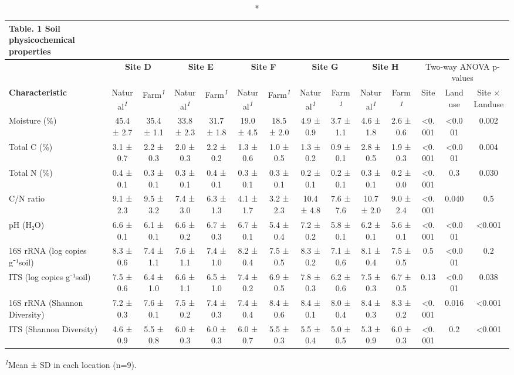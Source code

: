 \newlength\holdLTleft\newlength\holdLTright\setlength\holdLTleft{\LTleft}\relax\setlength\holdLTright{\LTright}\relax\setlength{}
\setlength{}\setlength{\LTpost}{0mm}
\begin{longtable}{@{\extracolsep{\fill}}lccccccccccccc}
\caption*{
{\large Table. 1 Soil physicochemical properties}
} \\ 
\toprule
 & \multicolumn{2}{c}{\textbf{Site D}} & \multicolumn{2}{c}{\textbf{Site E}} & \multicolumn{2}{c}{\textbf{Site F}} & \multicolumn{2}{c}{\textbf{Site G}} & \multicolumn{2}{c}{\textbf{Site H}} & \multicolumn{3}{c}{Two-way ANOVA p-values} \\ 
\cmidrule(lr){2-3} \cmidrule(lr){4-5} \cmidrule(lr){6-7} \cmidrule(lr){8-9} \cmidrule(lr){10-11} \cmidrule(lr){12-14}
\textbf{Characteristic} & Natural\textsuperscript{\textit{1}} & Farm\textsuperscript{\textit{1}} & Natural\textsuperscript{\textit{1}} & Farm\textsuperscript{\textit{1}} & Natural\textsuperscript{\textit{1}} & Farm\textsuperscript{\textit{1}} & Natural\textsuperscript{\textit{1}} & Farm\textsuperscript{\textit{1}} & Natural\textsuperscript{\textit{1}} & Farm\textsuperscript{\textit{1}} & Site & Landuse & Site × Landuse \\ 
\midrule\addlinespace[2.5pt]
Moisture (\%) & 45.4 ± 2.7 & 35.4 ± 1.1 & 33.8 ± 2.3 & 31.7 ± 1.8 & 19.0 ± 4.5 & 18.5 ± 2.0 & 4.9 ± 0.9 & 3.7 ± 1.1 & 4.6 ± 1.8 & 2.6 ± 0.6 & <0.001 & <0.001 & 0.002 \\ 
Total C (\%) & 3.1 ± 0.7 & 2.2 ± 0.3 & 2.0 ± 0.3 & 2.2 ± 0.2 & 1.3 ± 0.6 & 1.0 ± 0.5 & 1.3 ± 0.2 & 0.9 ± 0.1 & 2.8 ± 0.5 & 1.9 ± 0.3 & <0.001 & <0.001 & 0.004 \\ 
Total N (\%) & 0.4 ± 0.1 & 0.3 ± 0.1 & 0.3 ± 0.1 & 0.4 ± 0.1 & 0.3 ± 0.1 & 0.3 ± 0.1 & 0.2 ± 0.1 & 0.2 ± 0.1 & 0.3 ± 0.1 & 0.2 ± 0.0 & <0.001 & 0.3 & 0.030 \\ 
C/N ratio & 9.1 ± 2.3 & 9.5 ± 3.2 & 7.4 ± 3.0 & 6.3 ± 1.3 & 4.1 ± 1.7 & 3.2 ± 2.3 & 10.4 ± 4.8 & 7.6 ± 7.6 & 10.7 ± 2.0 & 9.0 ± 2.4 & <0.001 & 0.040 & 0.5 \\ 
pH (H₂O) & 6.6 ± 0.1 & 6.1 ± 0.1 & 6.6 ± 0.2 & 6.7 ± 0.3 & 6.7 ± 0.1 & 5.4 ± 0.4 & 7.2 ± 0.2 & 5.8 ± 0.1 & 6.2 ± 0.1 & 5.6 ± 0.1 & <0.001 & <0.001 & <0.001 \\ 
16S rRNA (log copies g⁻¹soil) & 8.3 ± 0.6 & 7.4 ± 1.1 & 7.6 ± 1.1 & 7.4 ± 1.0 & 8.2 ± 0.4 & 7.5 ± 0.5 & 8.3 ± 0.2 & 7.1 ± 0.6 & 8.1 ± 0.4 & 7.5 ± 0.5 & 0.5 & <0.001 & 0.2 \\ 
ITS (log copies g⁻¹soil) & 7.5 ± 0.6 & 6.4 ± 1.0 & 6.6 ± 1.1 & 6.5 ± 1.0 & 7.4 ± 0.2 & 6.9 ± 0.5 & 7.8 ± 0.3 & 6.2 ± 0.6 & 7.5 ± 0.3 & 6.7 ± 0.5 & 0.13 & <0.001 & 0.038 \\ 
16S rRNA (Shannon Diversity) & 7.2 ± 0.3 & 7.6 ± 0.1 & 7.5 ± 0.2 & 7.4 ± 0.3 & 7.4 ± 0.4 & 8.4 ± 0.6 & 8.4 ± 0.1 & 8.0 ± 0.4 & 8.4 ± 0.3 & 8.3 ± 0.2 & <0.001 & 0.016 & <0.001 \\ 
ITS (Shannon Diversity) & 4.6 ± 0.9 & 5.5 ± 0.8 & 6.0 ± 0.3 & 6.0 ± 0.3 & 6.0 ± 0.7 & 5.5 ± 0.3 & 5.5 ± 0.4 & 5.0 ± 0.5 & 5.3 ± 0.9 & 6.0 ± 0.3 & <0.001 & 0.2 & <0.001 \\ 
\bottomrule
\end{longtable}
\begin{minipage}{\linewidth}
\textsuperscript{\textit{1}}Mean ± SD in each location (n=9).\\
\end{minipage}
\setlength\LTleft{\holdLTleft}
\setlength\LTright{\holdLTright}
